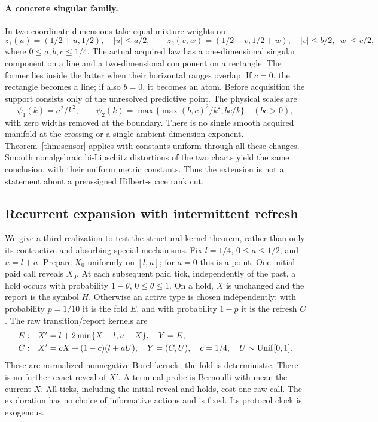 \paragraph{A concrete singular family.}
In two coordinate dimensions take equal mixture weights on
\[
 z_1(u)=(1/2+u,1/2),\quad |u|\le a/2,
 \qquad
 z_2(v,w)=(1/2+v,1/2+w),\quad |v|\le b/2,\ |w|\le c/2,
\]
where $0\le a,b,c\le1/4$. The actual acquired law has a one-dimensional singular component on a line and a two-dimensional component on a rectangle. The former lies inside the latter when their horizontal ranges overlap. If $c=0$, the rectangle becomes a line; if also $b=0$, it becomes an atom. Before acquisition the support consists only of the unresolved predictive point. The physical scales are
\[
 \psi_1(k)=a^2/k^2,\qquad
 \psi_2(k)=\max\{\max(b,c)^2/k^2,bc/k\}\quad(bc>0),
\]
with zero widths removed at the boundary. There is no single smooth acquired manifold at the crossing or a single ambient-dimension exponent. Theorem~\ref{thm:sensor} applies with constants uniform through all these changes. Smooth nonalgebraic bi-Lipschitz distortions of the two charts yield the same conclusion, with their uniform metric constants. Thus the extension is not a statement about a preassigned Hilbert-space rank cut.

\subsection{Recurrent expansion with intermittent refresh}\label{sec:recurrent}
We give a third realization to test the structural kernel theorem, rather than only its contractive and absorbing special mechanisms. Fix $l=1/4$, $0\le a\le1/2$, and $u=l+a$. Prepare $X_0$ uniformly on $[l,u]$; for $a=0$ this is a point. One initial paid call reveals $X_0$. At each subsequent paid tick, independently of the past, a hold occurs with probability $1-\theta$, $0\le\theta\le1$. On a hold, $X$ is unchanged and the report is the symbol $H$. Otherwise an active type is chosen independently: with probability $p=1/10$ it is the fold $E$, and with probability $1-p$ it is the refresh $C$. The raw transition/report kernels are
\begin{align}\label{eq:recurrent-kernel}
 E:&\quad X'=l+2\min\{X-l,u-X\},\quad Y=E,\\
 C:&\quad X'=cX+(1-c)(l+aU),\quad Y=(C,U),
           \quad c=1/4,\quad U\sim\operatorname{Unif}[0,1].\notag
\end{align}
These are normalized nonnegative Borel kernels; the fold is deterministic. There is no further exact reveal of $X'$. A terminal probe is Bernoulli with mean the current $X$. All ticks, including the initial reveal and holds, cost one raw call. The exploration has no choice of informative actions and is fixed. Its protocol clock is exogenous.

